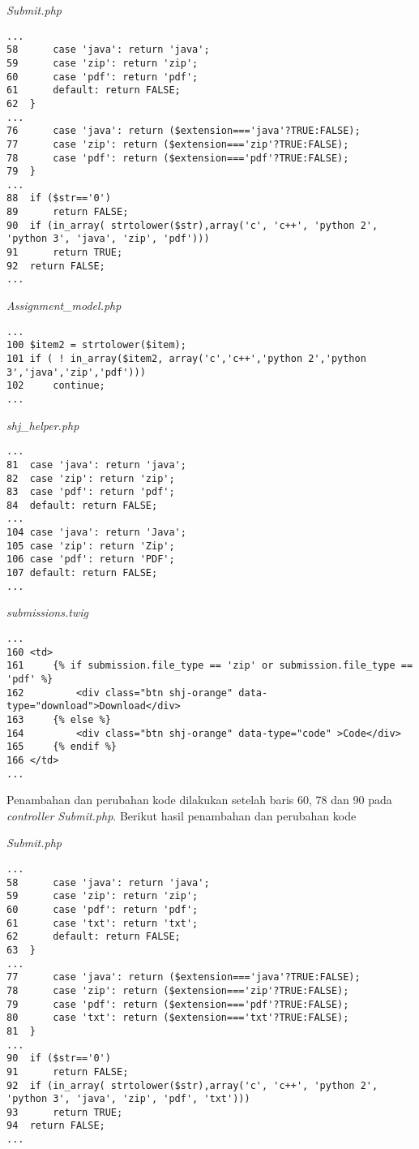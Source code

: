 \textit{Submit.php}
\begin{lstlisting}[basicstyle=\ttfamily, frame=single,
columns=fullflexible, keepspaces=true, breaklines=true]
...
58		case 'java': return 'java';
59		case 'zip': return 'zip';
60		case 'pdf': return 'pdf';
61		default: return FALSE;
62	}
...
76		case 'java': return ($extension==='java'?TRUE:FALSE);
77		case 'zip': return ($extension==='zip'?TRUE:FALSE);
78		case 'pdf': return ($extension==='pdf'?TRUE:FALSE);
79	}
...
88	if ($str=='0')
89		return FALSE;
90	if (in_array( strtolower($str),array('c', 'c++', 'python 2', 'python 3', 'java', 'zip', 'pdf')))
91		return TRUE;
92	return FALSE;
...
\end{lstlisting}

\textit{Assignment\_model.php}
\begin{lstlisting}[basicstyle=\ttfamily, frame=single,
columns=fullflexible, keepspaces=true, breaklines=true]
...
100	$item2 = strtolower($item);
101	if ( ! in_array($item2, array('c','c++','python 2','python 3','java','zip','pdf')))
102		continue;
...
\end{lstlisting}

\textit{shj\_helper.php}
\begin{lstlisting}[basicstyle=\ttfamily, frame=single,
columns=fullflexible, keepspaces=true, breaklines=true]
...
81	case 'java': return 'java';
82	case 'zip': return 'zip';
83	case 'pdf': return 'pdf';
84	default: return FALSE;
...
104	case 'java': return 'Java';
105	case 'zip': return 'Zip';
106	case 'pdf': return 'PDF';
107	default: return FALSE;
...
\end{lstlisting}

\textit{submissions.twig}
\begin{lstlisting}[basicstyle=\ttfamily, frame=single,
columns=fullflexible, keepspaces=true, breaklines=true]
...
160	<td>
161		{% if submission.file_type == 'zip' or submission.file_type == 'pdf' %}
162			<div class="btn shj-orange" data-type="download">Download</div>
163		{% else %}
164			<div class="btn shj-orange" data-type="code" >Code</div>
165		{% endif %}
166	</td>
...
\end{lstlisting}

Penambahan dan perubahan kode dilakukan setelah baris 60, 78 dan 90 pada \textit{controller Submit.php}. Berikut hasil penambahan dan perubahan kode 

\textit{Submit.php}
\begin{lstlisting}[basicstyle=\ttfamily, frame=single,
columns=fullflexible, keepspaces=true, breaklines=true]
...
58		case 'java': return 'java';
59		case 'zip': return 'zip';
60		case 'pdf': return 'pdf';
61		case 'txt': return 'txt';
62		default: return FALSE;
63	}
...
77		case 'java': return ($extension==='java'?TRUE:FALSE);
78		case 'zip': return ($extension==='zip'?TRUE:FALSE);
79		case 'pdf': return ($extension==='pdf'?TRUE:FALSE);
80		case 'txt': return ($extension==='txt'?TRUE:FALSE);
81	}
...
90	if ($str=='0')
91		return FALSE;
92	if (in_array( strtolower($str),array('c', 'c++', 'python 2', 'python 3', 'java', 'zip', 'pdf', 'txt')))
93		return TRUE;
94	return FALSE;
...
\end{lstlisting}


